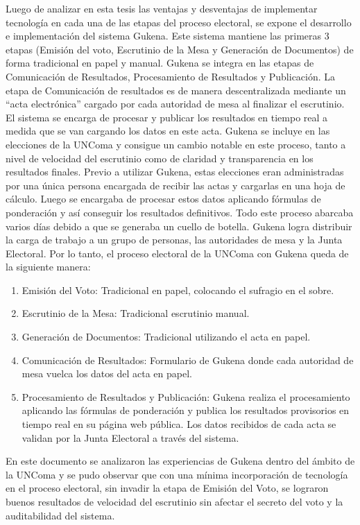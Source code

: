 Luego de analizar en esta tesis las ventajas y desventajas de implementar tecnología en cada una de las etapas del proceso electoral, se expone el desarrollo e implementación del sistema Gukena. Este sistema mantiene las primeras 3 etapas (Emisión del voto, Escrutinio de la Mesa y Generación de Documentos) de forma tradicional en papel y manual. Gukena se integra en las etapas de Comunicación de Resultados, Procesamiento de Resultados y Publicación. La etapa de Comunicación de resultados es de manera descentralizada mediante un ``acta electrónica'' cargado por cada autoridad de mesa al finalizar el escrutinio. El sistema se encarga de procesar y publicar los resultados en tiempo real a medida que se van cargando los datos en este acta.\newline
Gukena se incluye en las elecciones de la UNComa y consigue un cambio notable en este proceso, tanto a nivel de velocidad del escrutinio como de claridad y transparencia en los resultados finales. Previo a utilizar Gukena, estas elecciones eran administradas por una única persona encargada de recibir las actas y cargarlas en una hoja de cálculo. Luego se encargaba de procesar estos datos aplicando fórmulas de ponderación y así conseguir los resultados definitivos. Todo este proceso abarcaba varios días debido a que se generaba un cuello de botella. Gukena logra distribuir la carga de trabajo a un grupo de personas, las autoridades de mesa y la Junta Electoral.\newline
Por lo tanto, el proceso electoral de la UNComa con Gukena queda de la siguiente manera:
\begin{enumerate}
    \item Emisión del Voto: Tradicional en papel, colocando el sufragio en el sobre.
    \item Escrutinio de la Mesa: Tradicional escrutinio manual.
    \item Generación de Documentos: Tradicional utilizando el acta en papel.
    \item Comunicación de Resultados: Formulario de Gukena donde cada autoridad de mesa vuelca los datos del acta en papel.
    \item Procesamiento de Resultados y Publicación: Gukena realiza el procesamiento aplicando las fórmulas de ponderación y publica los resultados provisorios en tiempo real en su página web pública. Los datos recibidos de cada acta se validan por la Junta Electoral a través del sistema.
\end{enumerate}
En este documento se analizaron las experiencias de Gukena dentro del ámbito de la UNComa y se pudo observar que con una mínima incorporación de tecnología en el proceso electoral, sin invadir la etapa de Emisión del Voto, se lograron buenos resultados de velocidad del escrutinio sin afectar el secreto del voto y la auditabilidad del sistema.\newline
